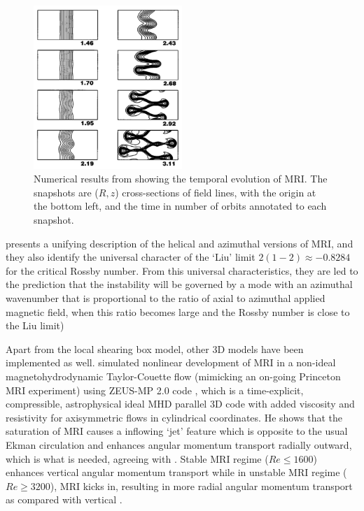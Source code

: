 \documentclass{jfm}
\begin{document}
\begin{figure}
    \centering
    \includegraphics[width=0.50\textwidth]{Balbus1998}
    \caption{Numerical results from \cite{Balbus1998} showing the temporal evolution of MRI. The snapshots are ($R, z$) cross-sections of field lines, with the origin at the bottom left, and the time in number of orbits annotated to each snapshot.}
    \label{fig:Balbus1998}
\end{figure}


\cite{Kirillov2012} presents a unifying description of the helical and
azimuthal versions of MRI, and they also identify the universal character of
the `Liu' limit $2(1 - 2) \approx - 0.8284$ for the critical Rossby number.
From this universal characteristics, they are led to the prediction that the
instability will be governed by a mode with an azimuthal wavenumber that is
proportional to the ratio of axial to azimuthal applied magnetic field, when
this ratio becomes large and the Rossby number is close to the Liu limit)

Apart from the local shearing box model, other 3D models have been implemented
as well. \cite{Liu2008} simulated nonlinear development of MRI in a non-ideal
magnetohydrodynamic Taylor-Couette flow (mimicking an on-going Princeton MRI
experiment) using ZEUS-MP 2.0 code \citep{Hayes2006}, which is a time-explicit,
compressible, astrophysical ideal MHD parallel 3D code with added viscosity and
resistivity for axisymmetric flows in cylindrical coordinates. He shows that
the saturation of MRI causes a inflowing `jet' feature which is opposite to the
usual Ekman circulation and enhances angular momentum transport radially
outward, which is what is needed, agreeing with \cite{Hawley1995}. Stable MRI
regime ($ Re \le 1600$) enhances vertical angular momentum transport while in
unstable MRI regime ($Re \ge 3200$), MRI kicks in, resulting in more radial
angular momentum transport as compared with vertical \citep{Liu2008}.
\end{document}
